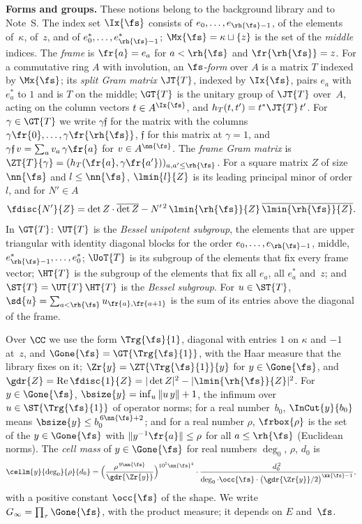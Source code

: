 \documentclass[11pt,a4paper]{article}
\newcommand{\m}[1]{\mbox{$#1$}}        %
\newcommand{\subhead}[1]{\par\addvspace{9pt plus 2pt}\Needspace{4\baselineskip}\noindent\textbf{#1}\enspace\ignorespaces}
\theoremstyle{plainx}
\theoremstyle{uprightx}
\renewcommand{\m}[1]{$#1$}
\newcommand{\sk}{\kk{\fs}}
\newcommand{\sn}{\nn{\fs}}
\newcommand{\sro}{\rh{\fs}}
\newcommand{\Ginf}{G_{\infty}}
\newcommand{\Tone}{\Trg{\fs}{1}}
\newcommand{\cj}[1]{\overline{#1}}
\newcommand{\ReP}{\operatorname{Re}}
\begin{document}
\subhead{Forms and groups.} These notions belong to the background library and to Note~S. The index set
\m{\Ix{\fs}} consists of \m{e_0,\dots,e_{\sro-1}}, of the elements of~$\kappa$, of~$z$, and of
\m{e^*_0,\dots,e^*_{\sro-1}}; \m{\Mx{\fs}=\kappa\sqcup\{z\}} is the set of the \emph{middle} indices. The \emph{frame} is
\m{\fr{a}=e_a} for \m{a<\sro} and \m{\fr{\sro}=z}. For a commutative ring $A$ with involution, an
\emph{$\fs$-form} over $A$ is a matrix $T$ indexed by \m{\Mx{\fs}}; its \emph{split Gram matrix} \m{\JT{T}},
indexed by \m{\Ix{\fs}}, pairs $e_a$ with $e^*_a$ to $1$ and is $T$ on the middle; \m{\GT{T}} is the unitary group
of \m{\JT{T}} over~$A$, acting on the column vectors \m{t\in A^{\Ix{\fs}}}, and \m{h_T(t,t')=t^*\JT{T}\,t'}. For \m{\gamma\in\GT{T}} we write
\m{\gamma\mathfrak f} for the matrix with the columns \m{\gamma\fr{0},\dots,\gamma\fr{\sro}}, \m{\mathfrak f} for
this matrix at \m{\gamma=1}, and \m{\gamma\mathfrak f\,v=\sum_a v_a\,\gamma\fr{a}} for \m{v\in A^{\sn}}. The
\emph{frame Gram matrix} is \m{\ZT{T}{\gamma}=(h_T(\fr{a},\gamma\fr{a'}))_{a,a'\le\sro}}. For a square matrix $Z$
of size \m{\sn} and \m{l\le\sn}, \m{\lmin{l}{Z}} is its leading principal minor of order~$l$, and for \m{N'\in A}
\[\fdisc{N'}{Z}=\det Z\cdot\cj{\det Z}-N'^{\,2}\,\lmin{\sro}{Z}\,\cj{\lmin{\sro}{Z}}.\]
In \m{\GT{T}}: \m{\UT{T}} is the \emph{Bessel unipotent subgroup}, the elements that are upper triangular with
identity diagonal blocks for the order \m{e_0,\dots,e_{\sro-1}}, middle, \m{e^*_{\sro-1},\dots,e^*_0}; \m{\UoT{T}} is
its subgroup of the elements that fix every frame vector; \m{\HT{T}} is the subgroup of the elements that fix all
$e_a$, all $e^*_a$ and~$z$; and \m{\ST{T}=\UT{T}\,\HT{T}} is the \emph{Bessel subgroup}. For \m{u\in\ST{T}},
\m{\sd{u}=\sum_{a<\sro}u_{\fr{a},\fr{a+1}}} is the sum of its entries above the diagonal of the frame.

Over \m{\CC} we use the form \m{\Tone}, diagonal with entries $1$ on $\kappa$ and $-1$ at~$z$, and
\m{\Gone{\fs}=\GT{\Tone}}, with the Haar measure that the library fixes on it; \m{\Zr{y}=\ZT{\Tone}{y}} for
\m{y\in\Gone{\fs}}, and \m{\gdr{Z}=\ReP\fdisc{1}{Z}=|\det Z|^2-|\lmin{\sro}{Z}|^2}. For \m{y\in\Gone{\fs}},
\m{\bsize{y}=\inf_u\|u\,y\|+1}, the infimum over \m{u\in\ST{\Tone}} of operator norms; for a real number~$b_0$,
\m{\InCut{y}{b_0}} means \m{\bsize{y}\le b_0^{\,6\sn+2}}; and for a real number $\rho$, \m{\frbox{\rho}} is the set
of the \m{y\in\Gone{\fs}} with \m{\|y^{-1}\fr{a}\|\le\rho} for all \m{a\le\sro} (Euclidean norms). The \emph{cell mass} of
\m{y\in\Gone{\fs}} for real numbers $\deg_0$, $\rho$, $d_0$ is
\[\cellm{y}{\deg_0}{\rho}{d_0}=\Bigl(\frac{\rho^{\,9\sn}}{\gdr{\Zr{y}}}\Bigr)^{10^5\sn^4}\cdot
\frac{d_0^{\,2}}{\deg_0\cdot\occ{\fs}\cdot\bigl(\gdr{\Zr{y}}/2\bigr)^{\sk-1}},\]
with a positive constant \m{\occ{\fs}} of the shape. We write \m{\Ginf=\prod_\tau\Gone{\fs}}, with the product
measure; it depends on $E$ and~$\fs$.
\end{document}
